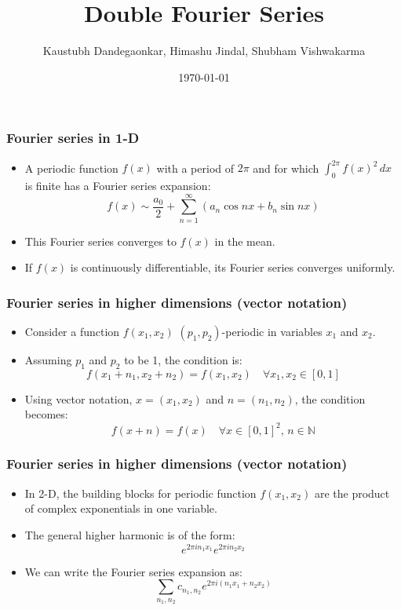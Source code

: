 \documentclass{beamer}
\title{Double Fourier Series}
\author{Kaustubh Dandegaonkar, Himashu Jindal, Shubham Vishwakarma}
\date{\today}
\begin{document}
\frame{\titlepage}


\begin{frame}
\frametitle{Fourier series in 1-D}
\begin{itemize}
    \item A periodic function $f(x)$ with a period of $2\pi$ and for which $\int_{0}^{2\pi} f(x)^2 \,dx$ is finite has a Fourier series expansion:
    \[ f(x) \sim \frac{a_0}{2} + \sum_{n=1}^{\infty} \left( a_n \cos nx + b_n \sin nx \right) \]
    \item This Fourier series converges to $f(x)$ in the mean.
    \item If $f(x)$ is continuously differentiable, its Fourier series converges uniformly.
\end{itemize}
\end{frame}


\begin{frame}
\frametitle{Fourier series in higher dimensions (vector notation)}
\begin{itemize}

    \item Consider a function $f(x_1, x_2)$ $(p_1, p_2)$-periodic in variables $x_1$ and $x_2$.
    \item Assuming $p_1$ and $p_2$ to be 1, the condition is:
    \[ f(x_1 + n_1, x_2 + n_2) = f(x_1, x_2) \quad \forall x_1, x_2 \in [0, 1] \]
    \item Using vector notation, $x = (x_1, x_2)$ and $n = (n_1, n_2)$, the condition becomes:
    \[ f(x+n) = f(x) \quad \forall x \in [0, 1]^2, \, n \in \mathbb{N} \]
\end{itemize}
\end{frame}

\begin{frame}
\frametitle{Fourier series in higher dimensions (vector notation)}
\begin{itemize}

    \item In 2-D, the building blocks for periodic function $f(x_1, x_2)$ are the product of complex exponentials in one variable.
    \item The general higher harmonic is of the form:
    \[ e^{2\pi in_1 x_1} e^{2\pi in_2 x_2} \]
    \item We can write the Fourier series expansion as:
    \[ \sum_{n_1, n_2} c_{n_1, n_2} e^{2\pi i (n_1 x_1 + n_2 x_2)} \]
\end{itemize}
\end{frame}
\end{document}
